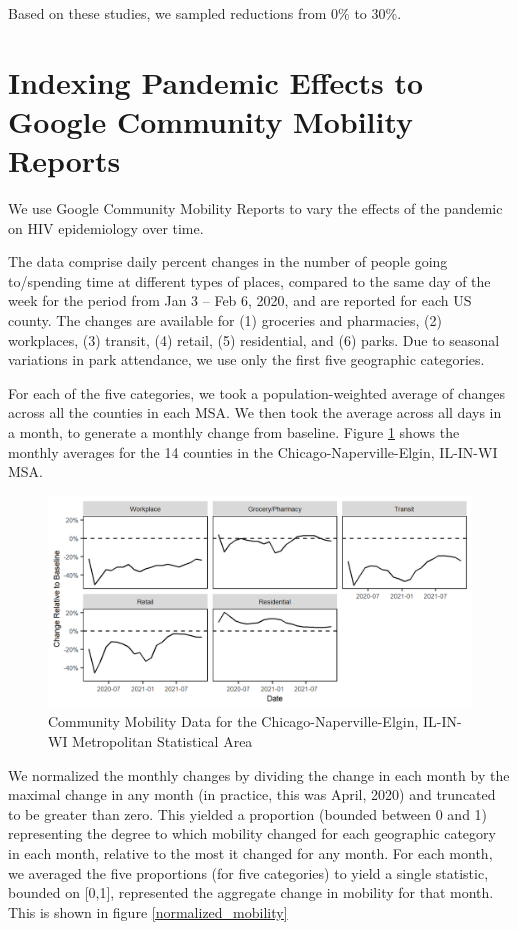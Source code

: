 \documentclass{article}
\begin{document}
Based on these studies, we sampled reductions from 0\% to 30\%.


\newpage
\section{Indexing Pandemic Effects to Google Community Mobility Reports} \label{mobility}

We use Google Community Mobility Reports \cite{google_mobility} to vary the effects of the pandemic on HIV epidemiology over time.

The data comprise daily percent changes in the number of people going to/spending time at different types of places, compared to the same day of the week for the period from Jan 3 – Feb 6, 2020, and are reported for each US county. The changes are available for (1) groceries and pharmacies, (2) workplaces, (3) transit, (4) retail, (5) residential, and (6) parks. Due to seasonal variations in park attendance, we use only the first five geographic categories.

For each of the five categories, we took a population-weighted average of changes across all the counties in each MSA. We then took the average across all days in a month, to generate a monthly change from baseline. Figure \ref{raw_monthly_mobility} shows the monthly averages for the 14 counties in the Chicago-Naperville-Elgin, IL-IN-WI MSA.

\begin{figure}[H] 
	\caption{Community Mobility Data for the Chicago-Naperville-Elgin, IL-IN-WI Metropolitan Statistical Area}\label{raw_monthly_mobility}
	\includegraphics[width=\textwidth]{images/mobility/raw_monthly}
\end{figure}

We normalized the monthly changes by dividing the change in each month by the maximal change in any month (in practice, this was April, 2020) and truncated to be greater than zero. This yielded a proportion (bounded between 0 and 1) representing the degree to which mobility changed for each geographic category in each month, relative to the most it changed for any month. For each month, we averaged the five proportions (for five categories) to yield a single statistic, bounded on [0,1], represented the aggregate change in mobility for that month. This is shown in figure \ref{normalized_mobility}
\end{document}

